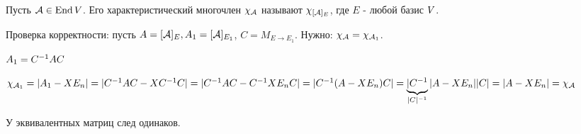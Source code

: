 \documentclass[main]{subfiles}
\begin{document}
    \begin{definition}
        Пусть $\mathcal{A} \in \operatorname{End} V$. Его характеристический многочлен $\chi_{\mathcal{A}}$ называют 
        $\chi_{[\mathcal{A}]_E}$, где $E$ - любой базис $V$.
    \end{definition}

    Проверка корректности: пусть $A = [\mathcal{A}]_E, A_1 = [\mathcal{A}]_{E_1}$,
    $C = M_{E \rightarrow E_1}$. Нужно: $\chi_{\mathcal{A}} = \chi_{\mathcal{A}_1}$.

    $A_1 = C^{-1}A C$
    
    $\chi_{\mathcal{A}_1} = |A_1 - X E_n| = 
    |C^{-1}A C - XC^{-1}C| = |C^{-1}A C - C^{-1}XE_nC| = 
    |C^{-1}(A - XE_n) C| = \underbrace{|C^{-1}}_{|C|^{-1}}|A - XE_n||C| =
    |A - XE_n| = \chi_{\mathcal{A}}$

    У эквивалентных матриц след одинаков. 
\end{document}
